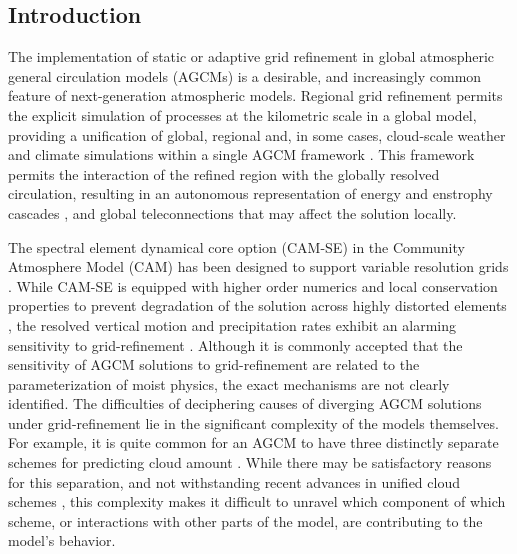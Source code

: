 \subsection{Introduction}
The implementation of static or adaptive grid refinement in global atmospheric general circulation models (AGCMs) is a desirable, and increasingly common feature of next-generation atmospheric models. Regional grid refinement permits the explicit simulation of processes at the kilometric scale in a global model, providing a unification of global, regional and, in some cases, cloud-scale weather and climate simulations within a single AGCM framework \citep[e.g.,][]{LETAL2001MWR,WA2011MWR,RETAL2013JCLIM,Z2014QJRMS,ZetAl2014JCb,RHUZ2016,HETAL2016JCLIM}. This framework permits the interaction of the refined region with the globally resolved circulation, resulting in an autonomous representation of energy and enstrophy cascades \citep{C1971JAS,L1999JFM}, and global teleconnections \citep{WG1981MWR} that may affect the solution locally. 

The spectral element dynamical core option (CAM-SE) in the Community Atmosphere Model (CAM) has been designed to support variable resolution grids \citep{ZetAl2014JCb,GetAl2014GMD}. While CAM-SE is equipped with higher order numerics and local conservation properties to prevent degradation of the solution across highly distorted elements \citep{TF2010JCP,ZetAl2014JC,GetAl2014GMD}, the resolved vertical motion and precipitation rates exhibit an alarming sensitivity to grid-refinement \citep[e.g.,][]{RETAL2012ASL,YETAL2014JCLIM,ZetAl2014JCb,OETAL2016JAMES,HR2017JCLIM}. Although it is commonly accepted that the sensitivity of AGCM solutions to grid-refinement are related to the parameterization of moist physics, the exact mechanisms are not clearly identified. The difficulties of deciphering causes of diverging AGCM solutions under grid-refinement lie in the significant complexity of the models themselves. For example, it is quite common for an AGCM to have three distinctly separate schemes for predicting cloud amount \citep[e.g.,][]{PETAL2014JCLIM}. While there may be satisfactory reasons for this separation, and not withstanding recent advances in unified cloud schemes \citep{GETAL2002JAS,P2014JAS}, this complexity makes it difficult to unravel which component of which scheme, or interactions with other parts of the model, are contributing to the model’s behavior. 

